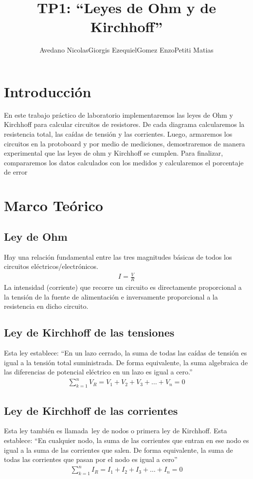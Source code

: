 \documentclass[12pt,a4paper,oneside]{article}
\title{TP1: ``Leyes de Ohm y de Kirchhoff''}
\author{
  \begin{itemize}
    \item Avedano Nicolas 
    \item Giorgis Ezequiel
    \item Gomez Enzo
    \item Petiti Matias
  \end{itemize}
}
\begin{document}
\maketitle
\tableofcontents
\newpage
\section{Introducción}
En este trabajo práctico de laboratorio implementaremos las leyes de Ohm y Kirchhoff  para calcular circuitos de resistores. De cada diagrama calcularemos la resistencia total, las caídas de tensión y las corrientes. Luego, armaremos los circuitos en la protoboard y por medio de mediciones, demostraremos de manera experimental  que las leyes de ohm y Kirchhoff se cumplen. Para finalizar, compararemos los datos calculados con los medidos y calcularemos el porcentaje de error
\section{Marco Teórico}
\subsection{Ley de Ohm}
Hay una relación fundamental entre las tres magnitudes básicas de todos los circuitos eléctricos/electrónicos.
\begin{align}
  I=\frac{V}{R} 
\end{align}
La intensidad (corriente) que recorre un circuito es directamente proporcional a la tensión de la fuente de alimentación e inversamente proporcional a la resistencia en dicho circuito.
\subsection{Ley de Kirchhoff de las tensiones}
Esta ley establece: “En un lazo cerrado, la suma de todas las caídas de tensión es igual a la tensión total suministrada. De forma equivalente, la suma algebraica de las diferencias de potencial eléctrico en un lazo es igual a cero.”
\begin{align}
  \sum_{k=1}^{n} V_{R} = V_{1} + V_{2} +V_{3} +\dots+V_{n} = 0
\end{align}
\subsection{Ley de Kirchhoff de las corrientes}
Esta ley también es llamada ley de nodos o primera ley de Kirchhoff. Esta establece: ``En cualquier nodo, la suma de las corrientes que entran en ese nodo es igual a la suma de las corrientes que salen. De forma equivalente, la suma de todas las corrientes que pasan por el nodo es igual a cero''
\begin{align}
  \sum_{k=1}^{n} I_{R} = I_{1} + I_{2} +I_{3} +\dots+I_{n} = 0
\end{align}
\end{document}
